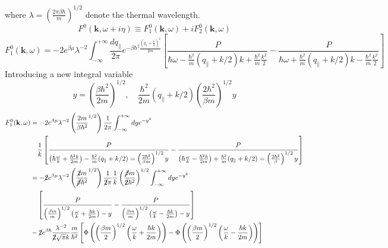 where $\lambda=\left( \frac{2\pi\beta\hbar}{m} \right)^{1/2}$ denote the thermal wavelength.
\begin{equation}
F^0(\mathbf k,\omega+i\eta)\equiv F^0_1(\mathbf k,\omega)+iF^0_2(\mathbf k,\omega)
\end{equation}
\begin{equation}
F^0_1(\mathbf k,\omega)=-2e^{\beta\mu} {\lambda^{-2}} \int_{-\infty}^{+\infty} \frac{d q_\parallel}{2\pi} e^{-\beta\hbar^2 \frac{\left(q_\parallel+\frac{ k}{2}\right)^2}{2m}}
\left[ \frac{P}{\hbar \omega-\frac{\hbar^2}{m} (q_\parallel+ k/2)k+\frac{\hbar^2}{m}\frac{k^2}{2}}-\frac{P}{\hbar \omega+\frac{\hbar^2}{m} (q_\parallel+ k/2)k-\frac{\hbar^2}{m}\frac{k^2}{2}} \right]
\end{equation}
Introducing a new integral variable
\[
y=\left( \frac{\beta\hbar^2}{2m} \right)^{1/2},\quad \frac{\hbar^2}{2m}(q_\parallel+k/2) \left( \frac{2\hbar^2}{\beta m} \right)^{1/2} y
\]
\begin{equation}
\begin{aligned}
F^0_1(\mathbf k,\omega)&=-2e^{\beta\mu} {\lambda^{-2}} \left( \frac{2m}{\beta\hbar^2}^{1/2} \right) \frac{1}{2\pi} \int_{-\infty}^{+\infty} dy e^{-y^2}\\
&\quad \frac{1}{k} \left[ \frac{P}{\left( \hbar \frac{\omega}{k}+\frac{\hbar^2k}{2m} \right)-\frac{\hbar^2}{m}(q_\parallel+k/2)=\left( \frac{2\hbar^2}{\beta m} \right)^{1/2} y}-\frac{P}{\left( \hbar \frac{\omega}{k}-\frac{\hbar^2k}{2m} \right)+\frac{\hbar^2}{m}(q_\parallel+k/2)=\left( \frac{2\hbar^2}{\beta} \right)^{1/2} y} \right]\\
&=-\cancel{2} e^{\beta\mu} {\lambda^{-2}} \left( \frac{\cancel{2}m}{\cancel{\beta}\hbar^2}^{1/2} \right) \frac{1}{\cancel{2}\pi} \frac{1}{k} \left( \frac{\cancel{\beta} m}{\cancel{2}\hbar^2} \right)^{1/2} \int_{-\infty}^{+\infty} dy e^{-y^2}\\
&\quad \left[ \frac{P}{\left(\frac{\beta m}{m}\right)^{1/2} \left( \frac{\omega}{k}+\frac{\hbar k}{2m} \right)-y}-\frac{P}{\left(\frac{\beta m}{m}\right)^{1/2} \left( \frac{\omega}{k}-\frac{\hbar k}{2m} \right)-y} \right]\\
&-\cancel{2}e^{\beta\hbar} \frac{\lambda^{-2}}{\cancel{2}\sqrt \pi k} \frac{m}{\hbar^2} \left[ \Phi \left(\left(\frac{\beta m}{2}\right)^{1/2} \left( \frac{\omega}{k}+\frac{\hbar k}{2m} \right)\right)- \Phi \left(\left(\frac{\beta m}{2}\right)^{1/2} \left( \frac{\omega}{k}-\frac{\hbar k}{2m} \right)\right) \right]
\end{aligned}
\end{equation}
